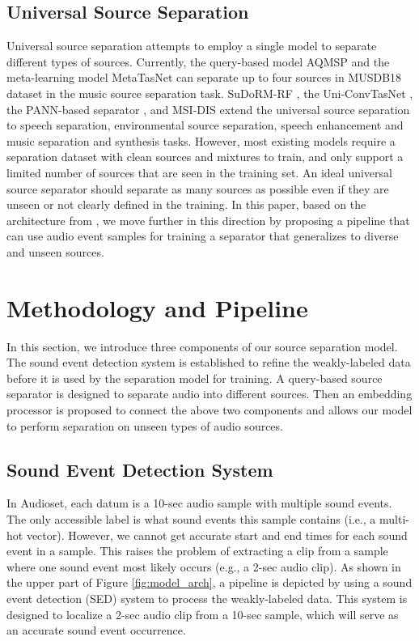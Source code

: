 \documentclass[letterpaper]{article} \usepackage{aaai22}  \usepackage{times}  \usepackage{helvet}  \usepackage{courier}  \usepackage[hyphens]{url}  \usepackage{graphicx} \urlstyle{rm} \def\UrlFont{\rm}  \usepackage{natbib}  \usepackage{caption} \DeclareCaptionStyle{ruled}{labelfont=normalfont,labelsep=colon,strut=off} \frenchspacing  \setlength{\pdfpagewidth}{8.5in}  \setlength{\pdfpageheight}{11in}  \usepackage{algorithm}
\begin{document}
\subsection{Universal Source Separation}
Universal source separation attempts to employ a single model to separate different types of sources. Currently, the query-based model AQMSP \cite{aqmsp} and the meta-learning model MetaTasNet \cite{metatasnet} can separate up to four sources in MUSDB18 dataset in the music source separation task. SuDoRM-RF \cite{sudoss}, the Uni-ConvTasNet \cite{uss}, the PANN-based separator \cite{qiangss}, and MSI-DIS \cite{zs-gus} extend the universal source separation to speech separation, environmental source separation, speech enhancement and music separation and synthesis tasks. However, most existing models require a separation dataset with clean sources and mixtures to train, and only support a limited number of sources that are seen in the training set. An ideal universal source separator should separate as many sources as possible even if they are unseen or not clearly defined in the training. In this paper, based on the architecture from \cite{qiangss}, we move further in this direction by proposing a pipeline that can use audio event samples for training a separator that generalizes to diverse and unseen sources.


\section{Methodology and Pipeline}
In this section, we introduce three components of our source separation model. The sound event detection system is established to refine the weakly-labeled data before it is used by the separation model for training. A query-based source separator is designed to separate audio into different sources. Then an embedding processor is proposed to connect the above two components and allows our model to perform separation on unseen types of audio sources.

\subsection{Sound Event Detection System}

In Audioset, each datum is a 10-sec audio sample with multiple sound events. The only accessible label is what sound events this sample contains (i.e., a multi-hot vector). However, we cannot get accurate start and end times for each sound event in a sample. This raises the problem of extracting a clip from a sample where one sound event most likely occurs (e.g., a 2-sec audio clip). As shown in the upper part of Figure \ref{fig:model_arch}, a pipeline is depicted by using a sound event detection (SED) system to process the weakly-labeled data. This system is designed to localize a 2-sec audio clip from a 10-sec sample, which will serve as an accurate sound event occurrence.
\end{document}
